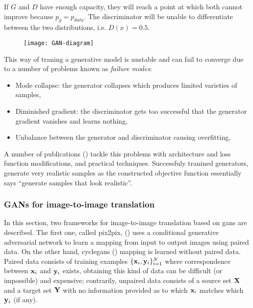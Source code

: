 \documentclass[../main.tex]{subfiles}
\begin{document}
If $G$ and $D$ have enough capacity, they will reach a point at which both cannot
improve because $p_g = p_{data}$.
The discriminator will be unable to differentiate between the two distributions,
i.e. $D(x) = 0.5$.

\begin{figure}[H]
\centering
\texttt{[image: GAN-diagram]}
\caption{}
\label{fig:gan-diagram}
\end{figure}

This way of traning a generative model is unstable and can fail to converge due
to a number of problems known as \emph{failure modes}:
\begin{itemize}
  \item Mode collapse: the generator collapses which produces limited varieties
  of samples,
  \item Diminished gradient: the discriminator gets too successful that the
  generator gradient vanishes and learns nothing,
  \item Unbalance between the generator and discriminator causing overfitting,
\end{itemize}

A number of publications
(\cite{Arjovsky2017,miyato2018spectral,DBLP:journals/corr/SalimansGZCRC16})
tackle this problems with architecture and loss function modifications, and
practical techniques.
Successfuly tranined generators, generate
very realistic samples as the constructed objective function essentially says
``generate samples that look realistic''.

\subsubsection{GANs for image-to-image translation}

In this section, two frameworks for image-to-image translation based on \gls{gans}
are described. The first one, called pix2pix, (\cite{Isola2016}) uses a
conditional generative adversarial network to learn a mapping from input to
output images using paired data.
On the other hand, \gls{cyclegans} (\cite{Zhu2017a}) mapping is learned
without paired data.
Paired data consists of training examples
$\{\mathbf{x}_i, \mathbf{y}_i\}_{i=1}^N$
where correspondence between $\mathbf{x}_i$ and $\mathbf{y}_i$ exists, obtaining
this kind of data can be difficult (or impossible) and expensive; contrarily,
unpaired data consists of a source set $\mathbf{X}$ and a target set $\mathbf{Y}$
with no information provided as to which $\mathbf{x}_i$ matches which
$\mathbf{y}_i$ (if any).
\end{document}
